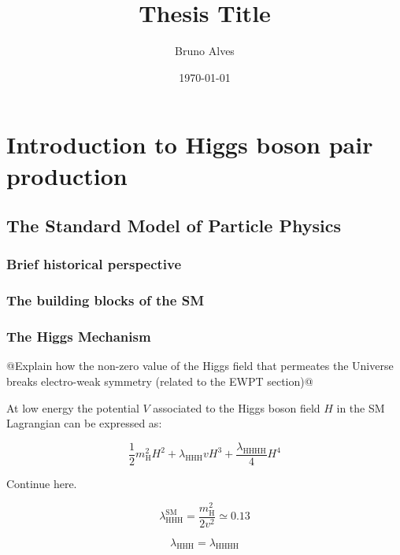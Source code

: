 \documentclass[11pt]{article}
\author{Bruno Alves}
\date{\today}
\title{Thesis Title}
\makeatletter
\renewcommand{\maketitle}{%
  \begingroup\parindent0pt
  \sffamily
  \Huge{\bfseries\@title}\par\bigskip
  \LARGE{\bfseries\@author}\par\medskip
  \normalsize\@date\par\bigskip
  \endgroup\@afterindentfalse\@afterheading}
\newcommand{\klfour}{\lambda_{\text{HHHH}}}
\newcommand{\klthree}{\lambda_{\text{HHH}}}
\newcommand{\mh}{m_{\text{H}}}
\makeatother
\begin{document}
\maketitle
\tableofcontents


\section{Introduction to Higgs boson pair production}
\label{sec:org81c7d66}
\subsection{The Standard Model of Particle Physics}
\label{sec:orgf820feb}
\label{sec:SM}
\subsubsection{Brief historical perspective}
\label{sec:orga53ef7e}
\subsubsection{The building blocks of the SM}
\label{sec:orgca8e97b}
\subsubsection{The Higgs Mechanism}
\label{sec:orgccab5b9}
\label{sec:HiggsMechanism}

@Explain how the non-zero value of the Higgs field that permeates the Universe breaks electro-weak symmetry (related to the EWPT section)@

At low energy the potential \(V\) associated to the Higgs boson field \(H\) in the SM Lagrangian can be expressed as:

\begin{equation}
\label{eq:sm_potential}
\frac{1}{2}\mh^{2}H^{2} + \klthree{}vH^{3} + \frac{\klfour}{4}H^{4}
\end{equation}

\noindent Continue here.

\begin{equation}
\label{eq:self_coupling}
\klthree^{\text{SM}} = \frac{\mh^{2}}{2v^{2}} \simeq 0.13
\end{equation}

\begin{equation}
\label{eq:dihiggs_coupling_relation}
\klthree = \klfour
\end{equation}
\end{document}
